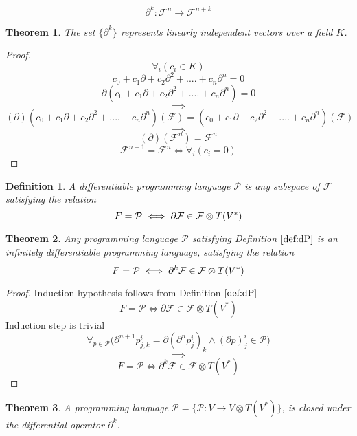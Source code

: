 \documentclass{article}
\newcommand{\F}{\mathcal{F}}
\newcommand{\dP}{\mathcal{P}}
\newcommand{\D}{\partial}
\newtheorem{definicija}{Definition}[section]
\newtheorem{izrek}{Theorem}[section]
\begin{document}
 \begin{equation}\label{eq:toFn+k}
 \D^k:\F^n\to\F^{n+k}
 \end{equation}
 
 \begin{izrek}\label{izr:linearnaNeodvisnost}
  The set $\{\partial^k\}$ represents linearly independent vectors over a field $K$.
 \end{izrek}
 
 \begin{proof} 
 $$\forall_i(c_i\in K)$$
	  $$c_0+c_1\D+c_2\D^2+....+c_n\D^n=0$$
	$$\D(c_0+c_1\D+c_2\D^2+....+c_n\D^n)=0$$
	$$\implies$$
	$$(\D)(c_0+c_1\D+c_2\D^2+....+c_n\D^n)(\F)=(c_0+c_1\D+c_2\D^2+....+c_n\D^n)(\F)$$
	$$\implies$$
	$$(\D)(\F^n)=\F^n$$
	$$\F^{n+1}=\F^n\iff\forall_i(c_i=0)$$
	
 \end{proof}
 
 \begin{definicija}\label{def:dP}
 	A differentiable programming language $\dP$ is any subspace of $\F$ satisfying the relation
 	\begin{equation}\label{eq:P}
 		\\F=\dP\iff\D\F\in\F\otimes T(V^*)
 	\end{equation}
 \end{definicija}

\begin{izrek}\label{izr:P}
	Any programming language $\dP$ satisfying Definition $\ref{def:dP}$ is an infinitely differentiable programming language, satisfying the relation
	\begin{equation}\label{eq:P_n}
	 		\\F=\dP\iff\D^k\F\in\F\otimes T(V^*)
	 	\end{equation}
\end{izrek}
\begin{proof} Induction hypothesis follows from Definition $\ref{def:dP}$
	$$F=\dP\iff\D\F\in\F\otimes T(V^*)$$
	Induction step is trivial
	\begin{equation}\label{eq:inductionStep}
	\forall_{p\in\dP}\Big(\D^{n+1}p^i_{j,k}=\D(\D^n p^i_j)_k\land(\D p)^i_j\in\dP\Big)
	\end{equation}
	$$\implies$$
	$$F=\dP\iff\D^k\F\in\F\otimes T(V^*)$$
\end{proof}

 \begin{izrek}\label{izr:dP}
	A programming language $\dP=\{\dP:V\to V\otimes T(V^*)\}$, is closed under the differential operator $\D^k$.
 \end{izrek}
 
\end{document}
